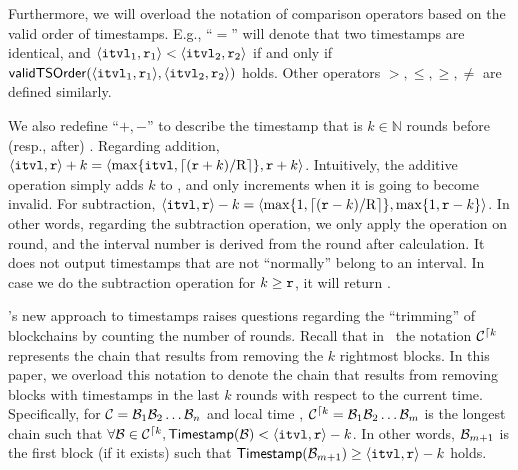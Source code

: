 Furthermore, we will overload the notation of comparison operators based on the valid order of timestamps.
%
E.g., ``$=$'' will denote that two timestamps are identical, and $\langle \mathtt{itvl}_1, \mathtt{r}_1 \rangle < \langle \mathtt{itvl}_2, \mathtt{r}_2 \rangle$ if and only if $\mathsf{validTSOrder}(\langle \mathtt{itvl}_1, \mathtt{r}_1 \rangle, \langle \mathtt{itvl}_2, \mathtt{r}_2 \rangle)$ holds.
%
Other operators $>, \le, \ge, \neq$ are defined similarly.

We also redefine ``$+, -$'' to describe the timestamp that is $k \in \mathbb{N}$ rounds before (resp., after) \protocolTime{\interval}{\round}.
%
Regarding addition, $\langle \mathtt{itvl}, \mathtt{r} \rangle + k = \langle \max \{ \mathtt{itvl}, \lceil (\mathtt{r} + k) / \mathrm{R} \rceil \}, \mathtt{r} + k \rangle$.
%
Intuitively, the additive operation simply adds $k$ to \round, and only increments \interval when it is going to become invalid.
%
For subtraction, $\langle \mathtt{itvl}, \mathtt{r} \rangle - k = \langle \max \{ 1, \lceil (\mathtt{r} - k) / \mathrm{R} \rceil \}, \max \{ 1, \mathtt{r} - k \} \rangle$.
%
In other words, regarding the subtraction operation, we only apply the operation on round, and the interval number is derived from the round after calculation.
%
It does not output timestamps that are not ``normally'' belong to an interval.
%
In case we do the subtraction operation for $k \ge \mathtt{r}$, it will return .

\timekeeper's new approach to timestamps raises questions regarding the ``trimming'' of blockchains by counting the number of rounds.
%
Recall that in~\cite{EC:GarKiaLeo15} the notation $\mathcal{C}^{\lceil{k}}$ represents the chain that results from removing the $k$ rightmost blocks.
%
In this paper, we overload this notation to denote the chain that results from removing blocks with timestamps in the last $k$ rounds with respect to the current time.
%
Specifically, for $\mathcal{C} = \mathcal{B}_1 \mathcal{B}_2 \ldots \mathcal{B}_n$ and local time \protocolTime{\interval}{\round}, $\mathcal{C}^{\lceil{k}} = \mathcal{B}_1 \mathcal{B}_2 \ldots \mathcal{B}_m$ is the longest chain such that $\forall \mathcal{B} \in \mathcal{C}^{\lceil{k}}, \mathsf{Timestamp}(\mathcal{B}) < \langle \mathtt{itvl}, \mathtt{r} \rangle - k$.
%
In other words, $\mathcal{B}_{m + 1}$ is the first block (if it exists) such that $\mathsf{Timestamp}(\mathcal{B}_{m + 1}) \ge \langle \mathtt{itvl}, \mathtt{r} \rangle - k$ holds.
